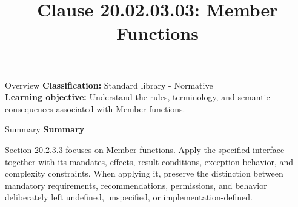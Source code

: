 \documentclass[10pt,letterpaper]{article}
\title{Clause 20.02.03.03: Member Functions}
\author{}
\date{}
\begin{document}
\maketitle
\begin{CornellOverviewBox}{Overview}
\textbf{Classification:} Standard library - Normative\\[2pt]
\textbf{Learning objective:} Understand the rules, terminology, and semantic consequences associated with Member functions.
\end{CornellOverviewBox}\begin{CornellSummaryBox}{Summary}
{\sffamily\bfseries\color{Accent} Summary}\par\vspace{3pt}Section 20.2.3.3 focuses on Member functions. Apply the specified interface together with its mandates, effects, result conditions, exception behavior, and complexity constraints. When applying it, preserve the distinction between mandatory requirements, recommendations, permissions, and behavior deliberately left undefined, unspecified, or implementation-defined.
\end{CornellSummaryBox}
\end{document}
